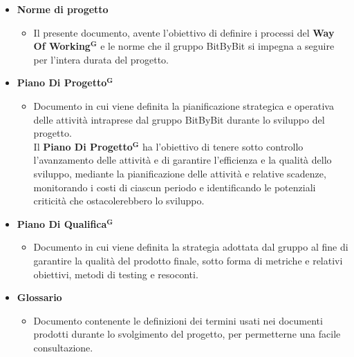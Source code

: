 \documentclass[a4paper,12pt]{article}
\newcommand{\term}[1]{\textbf{#1}$^\mathbf{G}$}
\begin{document}
\begin{itemize}
    \item \textbf{Norme di progetto}
    \begin{itemize}
        \item Il presente documento, avente l'obiettivo di definire i processi del \term{Way Of Working} e le norme che il gruppo BitByBit si impegna a seguire per l'intera durata del progetto.
    \end{itemize}

    \item \textbf{\term{Piano Di Progetto}}
    \begin{itemize}
        \item Documento in cui viene definita la pianificazione strategica e operativa delle attività intraprese dal gruppo BitByBit durante lo sviluppo del progetto. 
        \\Il \term{Piano Di Progetto} ha l’obiettivo di tenere sotto controllo l’avanzamento delle attività e di garantire l’efficienza e la qualità dello sviluppo, mediante la pianificazione delle attività e relative scadenze, monitorando i costi di ciascun periodo e identificando le potenziali criticità che ostacolerebbero lo sviluppo.
    \end{itemize}
    
    \item \textbf{\term{Piano Di Qualifica}}
    \begin{itemize}
        \item Documento in cui viene definita la strategia adottata dal gruppo al fine di garantire la qualità del prodotto finale, sotto forma di metriche e relativi obiettivi, metodi di testing e resoconti.
    \end{itemize}
    
    \item \textbf{Glossario}
    \begin{itemize}
        \item Documento contenente le definizioni dei termini usati nei documenti prodotti durante lo svolgimento del progetto, per permetterne una facile consultazione.
    \end{itemize}
\end{itemize}

\end{document}
